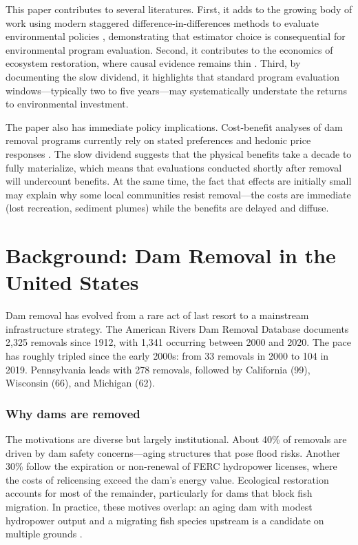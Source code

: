 \documentclass[12pt]{article}
\begin{document}
This paper contributes to several literatures. First, it adds to the growing body of work using modern staggered difference-in-differences methods to evaluate environmental policies \citep{marcus2021,greenstone2023}, demonstrating that estimator choice is consequential for environmental program evaluation. Second, it contributes to the economics of ecosystem restoration, where causal evidence remains thin \citep{keiser2019,olmstead2010}. Third, by documenting the slow dividend, it highlights that standard program evaluation windows---typically two to five years---may systematically understate the returns to environmental investment.

The paper also has immediate policy implications. Cost-benefit analyses of dam removal programs currently rely on stated preferences and hedonic price responses \citep{walls2022}. The slow dividend suggests that the physical benefits take a decade to fully materialize, which means that evaluations conducted shortly after removal will undercount benefits. At the same time, the fact that effects are initially small may explain why some local communities resist removal---the costs are immediate (lost recreation, sediment plumes) while the benefits are delayed and diffuse.

\section{Background: Dam Removal in the United States}

Dam removal has evolved from a rare act of last resort to a mainstream infrastructure strategy. The American Rivers Dam Removal Database documents 2,325 removals since 1912, with 1,341 occurring between 2000 and 2020. The pace has roughly tripled since the early 2000s: from 33 removals in 2000 to 104 in 2019. Pennsylvania leads with 278 removals, followed by California (99), Wisconsin (66), and Michigan (62).

\subsubsection*{Why dams are removed} The motivations are diverse but largely institutional. About 40\% of removals are driven by dam safety concerns---aging structures that pose flood risks. Another 30\% follow the expiration or non-renewal of FERC hydropower licenses, where the costs of relicensing exceed the dam's energy value. Ecological restoration accounts for most of the remainder, particularly for dams that block fish migration. In practice, these motives overlap: an aging dam with modest hydropower output and a migrating fish species upstream is a candidate on multiple grounds \citep{ho2017}.
\end{document}
